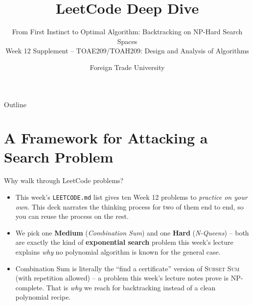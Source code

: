 \documentclass[11pt,aspectratio=169]{beamer}
\title{LeetCode Deep Dive}
\subtitle{From First Instinct to Optimal Algorithm: Backtracking on NP-Hard Search Spaces\\
\small Week 12 Supplement -- TOAE209/TOAH209: Design and Analysis of Algorithms}
\author{Foreign Trade University}
\date{}
\begin{document}
\begin{frame}
  \titlepage
\end{frame}

\begin{frame}{Outline}
  \tableofcontents
\end{frame}

\section{A Framework for Attacking a Search Problem}

\begin{frame}{Why walk through LeetCode problems?}
  \begin{itemize}
    \item This week's \texttt{LEETCODE.md} list gives ten Week 12 problems to
    \emph{practice on your own}. This deck narrates the thinking process for two of
    them end to end, so you can reuse the process on the rest.
    \item We pick one \textcolor{blue!50!black}{\textbf{Medium}} (\emph{Combination
    Sum}) and one \textcolor{red!60!black}{\textbf{Hard}} (\emph{N-Queens}) --
    both are exactly the kind of \textbf{exponential search} problem this week's
    lecture explains \emph{why} no polynomial algorithm is known for the general case.
    \item Combination Sum is literally the ``find a certificate'' version of
    \textsc{Subset Sum} (with repetition allowed) -- a problem this week's lecture
    notes prove is NP-complete. That is \emph{why} we reach for backtracking instead of
    a clean polynomial recipe.
  \end{itemize}
\end{frame}
\end{document}
